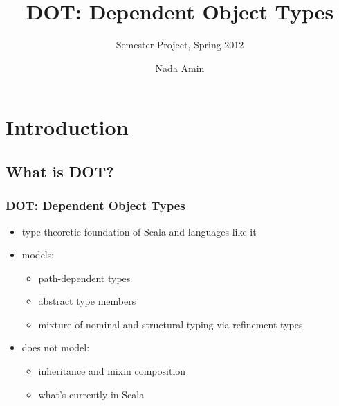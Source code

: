 \documentclass{beamer}
\title{DOT: Dependent Object Types}
\subtitle{Semester Project, Spring 2012}
\author{Nada Amin}
\institute{EPFL}
\date{}
\begin{document}
\frame{\titlepage}

\section{Introduction}

\subsection{What is DOT?}

\begin{frame}
\frametitle{DOT: Dependent Object Types}
\begin{itemize}
\item type-theoretic foundation of Scala and languages like it
\item models:
\begin{itemize}
\item path-dependent types
\item abstract type members
\item mixture of nominal and structural typing via refinement types
\end{itemize}
\item does not model:
\begin{itemize}
\item inheritance and mixin composition
\item what's currently in Scala
\end{itemize}
\end{itemize}
\end{frame}
\end{document}
